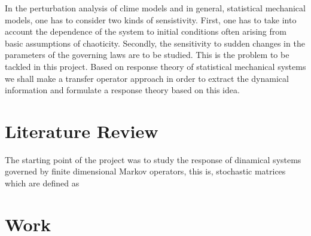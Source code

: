 
\noindent In the perturbation analysis of clime models and in general, statistical mechanical models, one has to consider two kinds of sensistivity. First, one has to take into account the dependence of the system to initial conditions often arising from basic assumptions of chaoticity. Secondly, the sensitivity to sudden changes in the parameters of the governing laws are to be studied. This is the problem to be tackled in this project. Based on response theory of statistical mechanical systems we shall make a transfer operator approach in order to extract the dynamical information and formulate a response theory based on this idea.


\section*{Literature Review}
The starting point of the project was to study the response of dinamical systems governed by finite dimensional Markov operators, this is, stochastic matrices which are defined as



\section*{Work}




